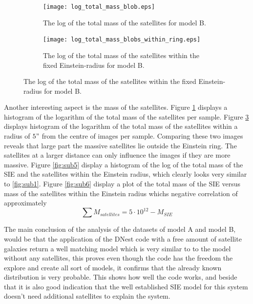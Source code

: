 \documentclass[useAMS,usenatbib]{mn2e}
\begin{document}
\begin{figure}[!h]
\hspace{5pt}
\begin{subfigure}{.45\textwidth}
  \centering
  \texttt{[image: log\_total\_mass\_blob.eps]}
\parbox{0.8\linewidth}{\caption{The log of the total mass of the satellites for model B.   \label{fig:sub3}}}
\end{subfigure}%
\hspace{-15pt}
\begin{subfigure}{.45\textwidth}
  \centering
  \vspace{6pt}
  \texttt{[image: log\_total\_mass\_blobs\_within\_ring.eps]}
\parbox{0.8\linewidth}{\caption{The log of the total mass of the satellites within the fixed Einstein-radius for model B.  \label{fig:sub4} }}
\end{subfigure}
   \end{figure}
\vspace{-15pt}
\noindent Another interesting aspect is the mass of the satellites. Figure \ref{fig:sub3} displays a histogram of the logarithm of the total mass of the satellites per sample. Figure \ref{fig:sub4} displays histogram of the logarithm of the total mass of the satellites within a radius of $ 5"$ from the centre of images per sample. Comparing these two images reveals that large part the massive satellites lie outside the Einstein ring. The satellites at a larger distance can only influence the images if they are more massive. Figure \ref{fig:sub5} display a histogram of the log of the total mass of the SIE and the satellites within the Einstein radius, which clearly looks very similar to \ref{fig:sub1}. 
Figure \ref{fig:sub6} display a plot of the total mass of the SIE versus mass of the satellites within the Einstein radius whichs  negative correlation of approximately 
\begin{equation}
 \sum M_{satellites} = 5\cdot10^{12} - M_{SIE}
 \end{equation}

The main conclusion of the analysis of the datasets of model A and model B, would be that the application of the DNest code with a free amount of satellite galaxies return a well matching model which is very similar to to the model without any satellites, this proves 
even though the code has the freedom the explore and create all sort of models, it confirms that the already known distribution is very probable. This shows how well the code works, and beside that it is also good indication that the well established SIE model for this system doesn't need additional satellites to explain the system. 
 
\end{document}
